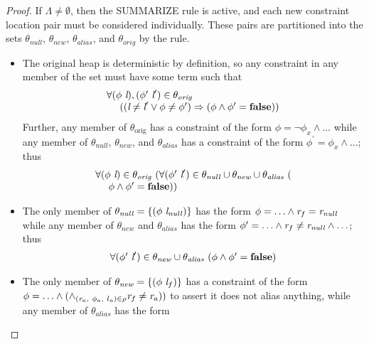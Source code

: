 \begin{proof}
If $\Lambda \neq \emptyset$, then the \textrm{S{\footnotesize UMMARIZE}} rule is
active, and each new constraint location pair must be considered
individually. These pairs are partitioned into the sets
$\theta_\mathit{null}$, $\theta_\mathit{new}$,
$\theta_\mathit{alias}$, and $\theta_\mathit{orig}$ by the rule. 
\begin{itemize}
\item The original heap is
  deterministic by definition, so any constraint in any member of the
  set must have some term such that
  \[\begin{array}{l}
     \forall (\phi\ \emph{l}),(\phi^\prime\ \emph{l}^\prime) \in \theta_\mathit{orig}\ \\
     \ \ \ \ ((\emph{l} \neq \emph{l}^\prime \vee \phi \neq \phi^\prime) \Rightarrow (\phi \wedge \phi^\prime = \textbf{false}))
     \end{array}
  \]
  Further, any member of $\theta_\mathrm{orig}$ has a constraint
  of the form $\phi = \neg \phi_x \wedge \ldots$ while any member of $\theta_\mathit{null}$, $\theta_\mathit{new}$, and
  $\theta_\mathit{alias}$ has a constraint of the form $\phi^\prime = \phi_x \wedge
  \ldots$; thus
  \[\begin{array}{l}
     \forall (\phi\ \emph{l}) \in \theta_\mathit{orig}\ (\forall (\phi^\prime\ \emph{l}^\prime) \in \theta_\mathit{null} \cup \theta_\mathit{new} \cup \theta_\mathit{alias}\ (\\
     \ \ \ \ \phi \wedge \phi^\prime = \textbf{false}))
    \end{array}
  \]
\item The only member of $\theta_\mathit{null}= \{(\phi\ \cfgnt{l}_\mathit{null})\}$ has the form $\phi = \ldots \wedge
  \emph{r}_f = \emph{r}_\mathit{null}$ while any member of
  $\theta_\mathit{new}$ and $\theta_\mathit{alias}$ has the form
  $\phi^\prime = \ldots \wedge \emph{r}_f \neq \emph{r}_\mathit{null} \wedge
  \ldots$; thus
  \[\begin{array}{l}
     \forall (\phi^\prime\ \emph{l}^\prime) \in \theta_\mathit{new} \cup \theta_\mathit{alias}\ (
     \phi \wedge \phi^\prime = \textbf{false})
    \end{array}
  \]
\item The only member of $\theta_\mathit{new} =  \{(\phi\ \emph{l}_f)\}$ has a constraint of the form
  $\phi = \ldots \wedge ( \wedge_{( \cfgnt{r}_a,\ \phi_a,\ l_a) \in \rho}
  \cfgnt{r}_f \ne \cfgnt{r}_a) )$ to assert it does not alias
  anything, while any member of $\theta_\mathit{alias}$ has the form

\end{itemize}
\end{proof}
